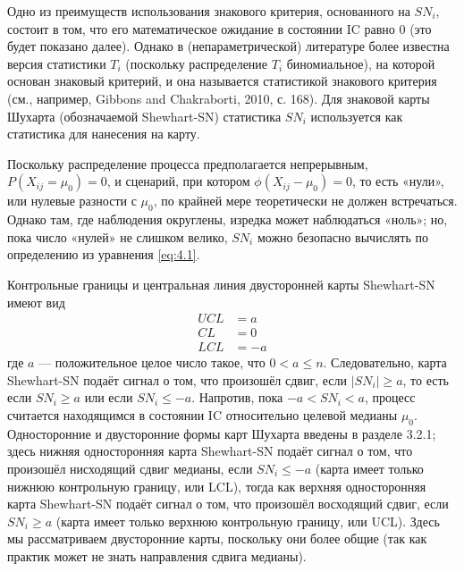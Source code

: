 Одно из преимуществ использования знакового критерия, основанного на \(SN_i\), состоит в том, что его математическое ожидание в состоянии IC равно 0 (это будет показано далее). Однако в (непараметрической) литературе более известна версия статистики \(T_i\) (поскольку распределение \(T_i\) биномиальное), на которой основан знаковый критерий, и она называется статистикой знакового критерия (см., например, Gibbons and Chakraborti, 2010, с. 168). Для знаковой карты Шухарта (обозначаемой Shewhart-SN) статистика \(SN_i\) используется как статистика для нанесения на карту.

Поскольку распределение процесса предполагается непрерывным, \(P(X_{ij} = \mu_0) = 0\), и сценарий, при котором \(\phi(X_{ij} - \mu_0) = 0\), то есть «нули», или нулевые разности с \(\mu_0\), по крайней мере теоретически не должен встречаться. Однако там, где наблюдения округлены, изредка может наблюдаться «ноль»; но, пока число «нулей» не слишком велико, \(SN_i\) можно безопасно вычислять по определению из уравнения \eqref{eq:4.1}.

Контрольные границы и центральная линия двусторонней карты Shewhart-SN имеют вид
\begin{equation}
	\begin{aligned}
		UCL &= a \\
		CL &= 0 \\
		LCL &= -a
	\end{aligned}
	\label{eq:4.3}
\end{equation}
где \(a\) --- положительное целое число такое, что \(0 < a \le n\). Следовательно, карта Shewhart-SN подаёт сигнал о том, что произошёл сдвиг, если \(|SN_i| \ge a\), то есть если \(SN_i \ge a\) или если \(SN_i \le -a\). Напротив, пока \(-a < SN_i < a\), процесс считается находящимся в состоянии IC относительно целевой медианы \(\mu_0\). Односторонние и двусторонние формы карт Шухарта введены в разделе 3.2.1; здесь нижняя односторонняя карта Shewhart-SN подаёт сигнал о том, что произошёл нисходящий сдвиг медианы, если \(SN_i \le -a\) (карта имеет только нижнюю контрольную границу, или LCL), тогда как верхняя односторонняя карта Shewhart-SN подаёт сигнал о том, что произошёл восходящий сдвиг, если \(SN_i \ge a\) (карта имеет только верхнюю контрольную границу, или UCL). Здесь мы рассматриваем двусторонние карты, поскольку они более общие (так как практик может не знать направления сдвига медианы).

